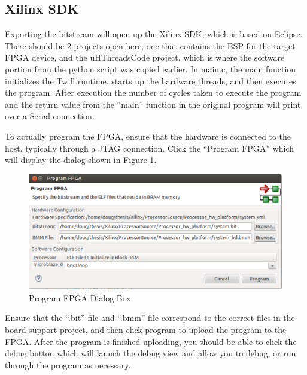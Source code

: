 \subsection{Xilinx SDK}
Exporting the bitstream will open up the Xilinx SDK, which is based on Eclipse. There should be 2 projects open here, one that contains the BSP for the target FPGA device, and the uHThreadsCode project, which is where the software portion from the python script was copied earlier. In main.c, the main function initializes the Twill runtime, starts up the hardware threads, and then executes the program. After execution the number of cycles taken to execute the program and the return value from the ``main'' function in the original program will print over a Serial connection.

To actually program the FPGA, ensure that the hardware is connected to the host, typically through a JTAG connection. Click the ``Program FPGA'' which will display the dialog shown in Figure \ref{fig:fpga_diag_box}.

\begin{figure}
	\centering
		\includegraphics[width=\textwidth]{figures/fpga_diag_box}
	\caption{Program FPGA Dialog Box\label{fig:fpga_diag_box}}
\end{figure}

Ensure that the ``.bit'' file and ``.bmm'' file correspond to the correct files in the board support project, and then click program to upload the program to the FPGA. After the program is finished uploading, you should be able to click the debug button which will launch the debug view and allow you to debug, or run through the program as necessary. 